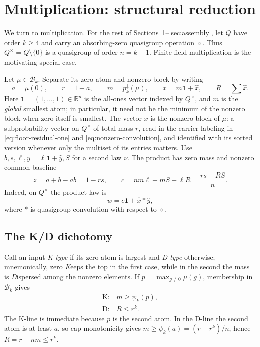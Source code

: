 \documentclass[11pt]{article}
\theoremstyle{definition}
\theoremstyle{remark}
\newcommand{\R}{\mathbb{R}}
\newcommand{\body}{\mathcal{B}}
\newcommand{\one}{\mathbf{1}}
\newcommand{\down}{\downarrow}
\begin{document}
\section{Multiplication: structural reduction}\label{sec:mul-reduction}

We turn to multiplication.  For the rest of
Sections~\ref{sec:mul-reduction}--\ref{sec:assembly}, let $Q$ have order
$k\ge4$ and carry an absorbing-zero quasigroup operation $\diamond$.
Thus $Q^\times=Q\setminus\{0\}$ is a quasigroup of order $n=k-1$.
Finite-field multiplication is the motivating special case.

Let $\mu\in\body_k$.  Separate its zero atom and nonzero block by writing
\begin{equation}\label{eq:floor-residual-one}
 a=\mu(0),\qquad r=1-a,\qquad
 m=p_k^\down(\mu),\qquad x=m\one+\hat x,\qquad R=\sum \hat x.
\end{equation}
Here $\one=(1,\ldots,1)\in\R^n$ is the all-ones vector indexed by
$Q^\times$, and $m$ is the \emph{global} smallest atom; in particular,
it need not be the minimum of the nonzero block when zero itself is smallest. 
The vector $x$ is the nonzero block of $\mu$: a subprobability vector on
$Q^\times$ of total mass $r$, read in the carrier labeling in
\eqref{eq:floor-residual-one} and \eqref{eq:nonzero-convolution}, and
identified with its sorted version whenever only the multiset of its
entries matters.
Use $b,s,\ell,y=\ell\one+\hat y,S$ for a second law $\nu$. 
The product has zero mass and nonzero common baseline
\begin{equation}\label{eq:mul-baseline}
 z=a+b-ab=1-rs,\qquad
 c=nm\ell+mS+\ell R=\frac{rs-RS}{n}.
\end{equation}
Indeed, on $Q^\times$ the product law is
\begin{equation}\label{eq:nonzero-convolution}
  w=c\one+\hat x\mathbin{*}\hat y,
\end{equation}
where $*$ is quasigroup convolution with respect to $\diamond$.

\subsection{The K/D dichotomy}

Call an input \emph{K-type} if its zero atom is largest and \emph{D-type}
otherwise; mnemonically, zero \emph{K}eeps the top in the first case, while
in the second the mass is \emph{D}ispersed among the nonzero elements.  If
$p=\max_{g\ne0}\mu(g)$, membership in $\body_k$ gives
\begin{equation}\label{eq:KD-dichotomy}
 \begin{array}{ll}
 \mathrm{K}:&m\ge\psi_k(p),\\[2pt]
 \mathrm{D}:&R\le r^k.
 \end{array}
\end{equation}
The K-line is immediate because $p$ is the second atom.  In the D-line the
second atom is at least $a$, so cap monotonicity gives
$m\ge\psi_k(a)=(r-r^k)/n$, hence $R=r-nm\le r^k$.
\end{document}
